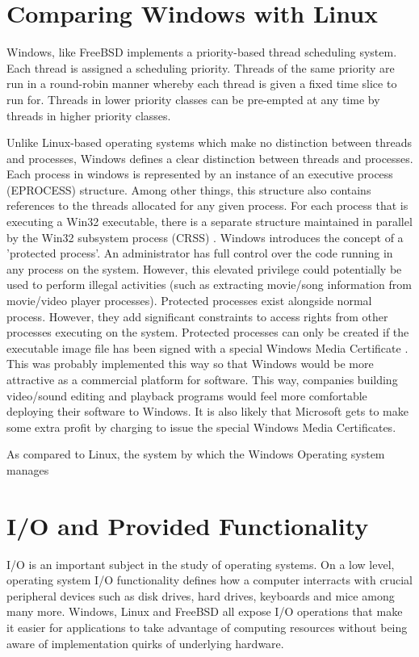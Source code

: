 \documentclass[onecolumn,10pt]{IEEETran}
\begin{document}
\section{Comparing Windows with Linux}
Windows, like FreeBSD implements a priority-based thread scheduling system.  Each thread is assigned a scheduling priority.  Threads of the same priority are run in a round-robin manner whereby each thread is given a fixed time slice to run for.  Threads in lower priority classes can be pre-empted at any time by threads in higher priority classes.

Unlike Linux-based operating systems which make no distinction between threads and processes, Windows defines a clear distinction between threads and processes.  Each process in windows is represented by an instance of an executive process (EPROCESS) structure.  Among other things, this structure also contains references to the threads allocated for any given process.  For each process that is executing a Win32 executable, there is a separate structure maintained in parallel by the Win32 subsystem process (CRSS) \cite{windows}.
	Windows introduces the concept of a 'protected process'.  An administrator has full control over the code running in any process on the system.  However, this elevated privilege could potentially be used to perform illegal activities (such as extracting movie/song information from movie/video player processes).  Protected processes exist alongside normal process.  However, they add significant constraints to access rights from other processes executing on the system.  Protected processes can only be created if the executable image file has been signed with a special Windows Media Certificate \cite{windows}.  This was probably implemented this way so that Windows would be more attractive as a commercial platform for software.  This way, companies building video/sound editing and playback programs would feel more comfortable deploying their software to Windows.  It is also likely that Microsoft gets to make some extra profit by charging to issue the special Windows Media Certificates.

As compared to Linux, the system by which the Windows Operating system manages 


\section{I/O and Provided Functionality}

I/O is an important subject in the study of operating systems.  On a low level, operating system I/O functionality defines how a computer interracts with crucial peripheral devices such as disk drives, hard drives, keyboards and mice among many more.  Windows, Linux and FreeBSD all expose I/O operations that make it easier for applications to take advantage of computing resources without being aware of implementation quirks of underlying hardware.
\end{document}
